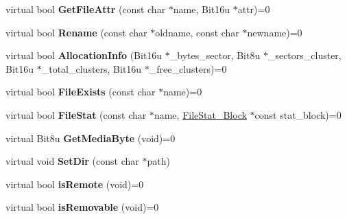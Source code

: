 \begin{DoxyCompactItemize}
\item 
\hypertarget{classDOS__Drive_aff8f34bd9601bceeeb587fd0e4cd51bf}{virtual bool {\bfseries Get\-File\-Attr} (const char $\ast$name, Bit16u $\ast$attr)=0}\label{classDOS__Drive_aff8f34bd9601bceeeb587fd0e4cd51bf}

\item 
\hypertarget{classDOS__Drive_a1329723ca172ad17e932caeb052469e8}{virtual bool {\bfseries Rename} (const char $\ast$oldname, const char $\ast$newname)=0}\label{classDOS__Drive_a1329723ca172ad17e932caeb052469e8}

\item 
\hypertarget{classDOS__Drive_a5e15b725bcef2e78fd17fad8981b560d}{virtual bool {\bfseries Allocation\-Info} (Bit16u $\ast$\-\_\-bytes\-\_\-sector, Bit8u $\ast$\-\_\-sectors\-\_\-cluster, Bit16u $\ast$\-\_\-total\-\_\-clusters, Bit16u $\ast$\-\_\-free\-\_\-clusters)=0}\label{classDOS__Drive_a5e15b725bcef2e78fd17fad8981b560d}

\item 
\hypertarget{classDOS__Drive_ac40baf5634ab1e58e38d0dda0dff3afb}{virtual bool {\bfseries File\-Exists} (const char $\ast$name)=0}\label{classDOS__Drive_ac40baf5634ab1e58e38d0dda0dff3afb}

\item 
\hypertarget{classDOS__Drive_a9e38d58283c5e54845e81751e36b646e}{virtual bool {\bfseries File\-Stat} (const char $\ast$name, \hyperlink{structFileStat__Block}{File\-Stat\-\_\-\-Block} $\ast$const stat\-\_\-block)=0}\label{classDOS__Drive_a9e38d58283c5e54845e81751e36b646e}

\item 
\hypertarget{classDOS__Drive_a344fbf135d82e7330c309c9b7dfad7e8}{virtual Bit8u {\bfseries Get\-Media\-Byte} (void)=0}\label{classDOS__Drive_a344fbf135d82e7330c309c9b7dfad7e8}

\item 
\hypertarget{classDOS__Drive_a60dbe76d92bff85e197fc51cc433f0e3}{virtual void {\bfseries Set\-Dir} (const char $\ast$path)}\label{classDOS__Drive_a60dbe76d92bff85e197fc51cc433f0e3}

\item 
\hypertarget{classDOS__Drive_afe789aa0e61388914c4ab1d73ff591d9}{virtual bool {\bfseries is\-Remote} (void)=0}\label{classDOS__Drive_afe789aa0e61388914c4ab1d73ff591d9}

\item 
\hypertarget{classDOS__Drive_a6931988116a287679e700e30083ec9de}{virtual bool {\bfseries is\-Removable} (void)=0}\label{classDOS__Drive_a6931988116a287679e700e30083ec9de}


\end{DoxyCompactItemize}
